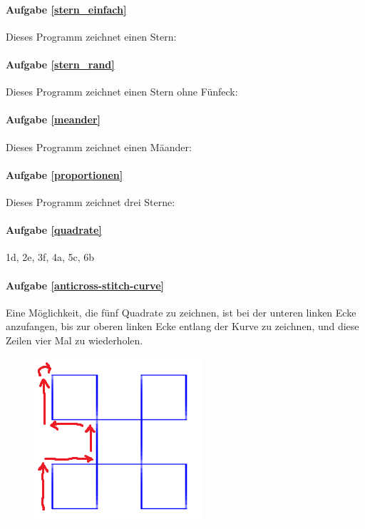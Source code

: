 \documentclass{article}
\begin{document}
\paragraph{Aufgabe \ref{stern_einfach}}
Dieses Programm zeichnet einen Stern:


\paragraph{Aufgabe \ref{stern_rand}}
Dieses Programm zeichnet einen Stern ohne Fünfeck:


\paragraph{Aufgabe \ref{meander}}
Dieses Programm zeichnet einen Mäander:


\paragraph{Aufgabe \ref{proportionen}}
Dieses Programm zeichnet drei Sterne:


\paragraph{Aufgabe \ref{quadrate}}
1d, 2e, 3f, 4a, 5c, 6b

\paragraph{Aufgabe \ref{anticross-stitch-curve}}
Eine Möglichkeit, die fünf Quadrate zu zeichnen, ist bei der unteren linken Ecke anzufangen, bis zur oberen linken Ecke entlang der Kurve zu zeichnen, und diese Zeilen vier Mal zu wiederholen.
\begin{figure}[H]
\centering
\includegraphics[width=0.3\linewidth]{pictures/anticross-stitch-curve1-expl.png}
\end{figure}

\end{document}
